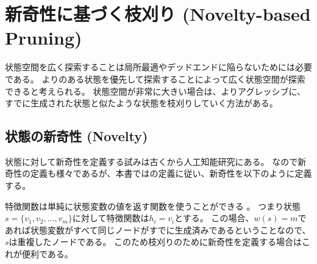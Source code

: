 



\section{新奇性に基づく枝刈り (Novelty-based Pruning)}
\label{sec:novelty-based-pruning}


状態空間を広く探索することは局所最適やデッドエンドに陥らないためには必要である。
よりのある状態を優先して探索することによって広く状態空間が探索できると考えられる。
状態空間が非常に大きい場合は、よりアグレッシブに、すでに生成された状態と似たような状態を枝刈りしていく方法がある。




\subsection{状態の新奇性 (Novelty)}
\label{sec:novelty}

状態に対して新奇性を定義する試みは古くから人工知能研究にある\cite{lehman2008exploiting}。
なので新奇性の定義も様々であるが、本書では\cite{geffner2015}の定義に従い、新奇性を以下のように定義する。


特徴関数は単純に状態変数の値を返す関数を使うことができる \cite{geffner2015, lipovetzky2015a}。
つまり状態$s = \{v_1, v_2,...,v_m\}$に対して特徴関数は$h_i = v_i$とする。
この場合、$w(s) = m$であれば状態変数がすべて同じノードがすでに生成済みであるということなので、$s$は重複したノードである。
このため枝刈りのために新奇性を定義する場合はこれが便利である。


